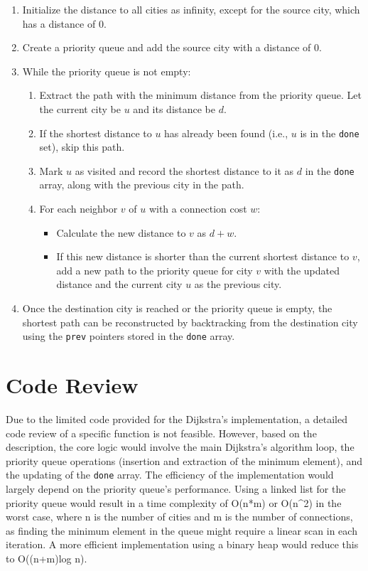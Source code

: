 \begin{enumerate}
    \item Initialize the distance to all cities as infinity, except for the source city, which has a distance of 0.
    \item Create a priority queue and add the source city with a distance of 0.
    \item While the priority queue is not empty:
    \begin{enumerate}
        \item Extract the path with the minimum distance from the priority queue. Let the current city be $u$ and its distance be $d$.
        \item If the shortest distance to $u$ has already been found (i.e., $u$ is in the \texttt{done} set), skip this path.
        \item Mark $u$ as visited and record the shortest distance to it as $d$ in the \texttt{done} array, along with the previous city in the path.
        \item For each neighbor $v$ of $u$ with a connection cost $w$:
        \begin{itemize}
            \item Calculate the new distance to $v$ as $d + w$.
            \item If this new distance is shorter than the current shortest distance to $v$, add a new path to the priority queue for city $v$ with the updated distance and the current city $u$ as the previous city.
        \end{itemize}
    \end{enumerate}
    \item Once the destination city is reached or the priority queue is empty, the shortest path can be reconstructed by backtracking from the destination city using the \texttt{prev} pointers stored in the \texttt{done} array.
\end{enumerate}

\section*{Code Review}
Due to the limited code provided for the Dijkstra's implementation, a detailed code review of a specific function is not feasible. However, based on the description, the core logic would involve the main Dijkstra's algorithm loop, the priority queue operations (insertion and extraction of the minimum element), and the updating of the \texttt{done} array. The efficiency of the implementation would largely depend on the priority queue's performance. Using a linked list for the priority queue would result in a time complexity of O(n*m) or O(n^2) in the worst case, where n is the number of cities and m is the number of connections, as finding the minimum element in the queue might require a linear scan in each iteration. A more efficient implementation using a binary heap would reduce this to O((n+m)log n).

